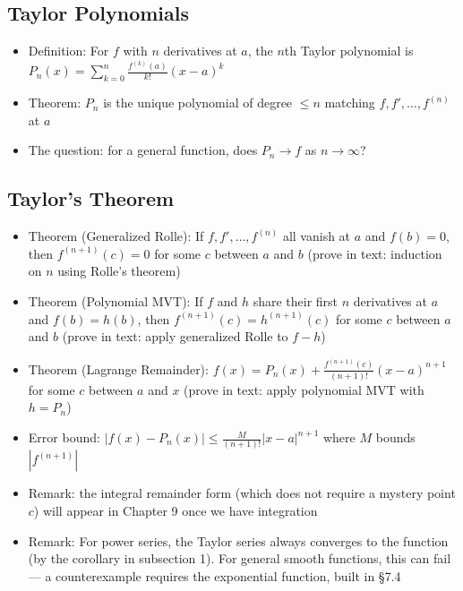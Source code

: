 \documentclass[
  10pt,
  letterpaper,
]{scrbook}
\providecommand{\tightlist}{%
  \setlength{\itemsep}{0pt}\setlength{\parskip}{0pt}}
\begin{document}
\subsection{Taylor Polynomials}\label{taylor-polynomials}

\begin{itemize}
\tightlist
\item
  Definition: For \(f\) with \(n\) derivatives at \(a\), the \(n\)th
  Taylor polynomial is
  \(P_n(x) = \sum_{k=0}^{n} \frac{f^{(k)}(a)}{k!}(x - a)^k\)
\item
  Theorem: \(P_n\) is the unique polynomial of degree \(\leq n\)
  matching \(f, f', \ldots, f^{(n)}\) at \(a\)
\item
  The question: for a general function, does \(P_n \to f\) as
  \(n \to \infty\)?
\end{itemize}

\subsection{Taylor's Theorem}\label{taylors-theorem}

\begin{itemize}
\tightlist
\item
  Theorem (Generalized Rolle): If \(f, f', \ldots, f^{(n)}\) all vanish
  at \(a\) and \(f(b) = 0\), then \(f^{(n+1)}(c) = 0\) for some \(c\)
  between \(a\) and \(b\) (prove in text: induction on \(n\) using
  Rolle's theorem)
\item
  Theorem (Polynomial MVT): If \(f\) and \(h\) share their first \(n\)
  derivatives at \(a\) and \(f(b) = h(b)\), then
  \(f^{(n+1)}(c) = h^{(n+1)}(c)\) for some \(c\) between \(a\) and \(b\)
  (prove in text: apply generalized Rolle to \(f - h\))
\item
  Theorem (Lagrange Remainder):
  \(f(x) = P_n(x) + \frac{f^{(n+1)}(c)}{(n+1)!}(x - a)^{n+1}\) for some
  \(c\) between \(a\) and \(x\) (prove in text: apply polynomial MVT
  with \(h = P_n\))
\item
  Error bound: \(|f(x) - P_n(x)| \leq \frac{M}{(n+1)!}|x - a|^{n+1}\)
  where \(M\) bounds \(|f^{(n+1)}|\)
\item
  Remark: the integral remainder form (which does not require a mystery
  point \(c\)) will appear in Chapter 9 once we have integration
\item
  Remark: For power series, the Taylor series always converges to the
  function (by the corollary in subsection 1). For general smooth
  functions, this can fail --- a counterexample requires the exponential
  function, built in §7.4
\end{itemize}
\end{document}
